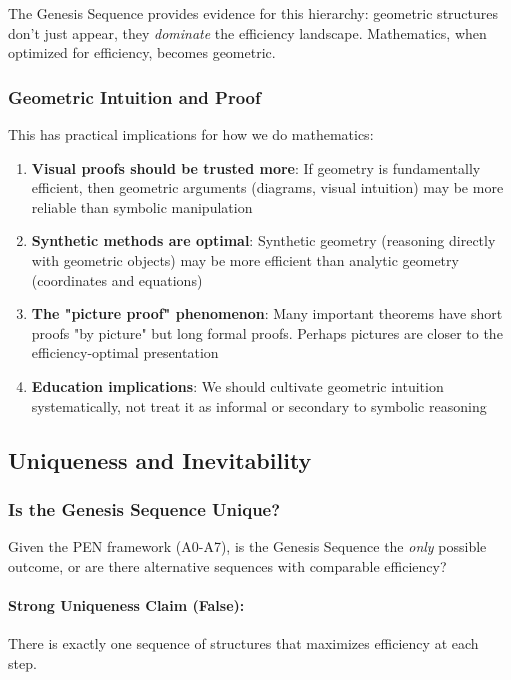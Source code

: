 \documentclass[11pt]{article}
\theoremstyle{definition}
\begin{document}
The Genesis Sequence provides evidence for this hierarchy: geometric structures don't just appear, they \emph{dominate} the efficiency landscape. Mathematics, when optimized for efficiency, becomes geometric.

\subsubsection{Geometric Intuition and Proof}

This has practical implications for how we do mathematics:

\begin{enumerate}
\item \textbf{Visual proofs should be trusted more}: If geometry is fundamentally efficient, then geometric arguments (diagrams, visual intuition) may be more reliable than symbolic manipulation

\item \textbf{Synthetic methods are optimal}: Synthetic geometry (reasoning directly with geometric objects) may be more efficient than analytic geometry (coordinates and equations)

\item \textbf{The "picture proof" phenomenon}: Many important theorems have short proofs "by picture" but long formal proofs. Perhaps pictures are closer to the efficiency-optimal presentation

\item \textbf{Education implications}: We should cultivate geometric intuition systematically, not treat it as informal or secondary to symbolic reasoning
\end{enumerate}

\subsection{Uniqueness and Inevitability}

\subsubsection{Is the Genesis Sequence Unique?}

Given the PEN framework (A0-A7), is the Genesis Sequence the \emph{only} possible outcome, or are there alternative sequences with comparable efficiency?

\paragraph{Strong Uniqueness Claim (False):}
There is exactly one sequence of structures that maximizes efficiency at each step.
\end{document}
